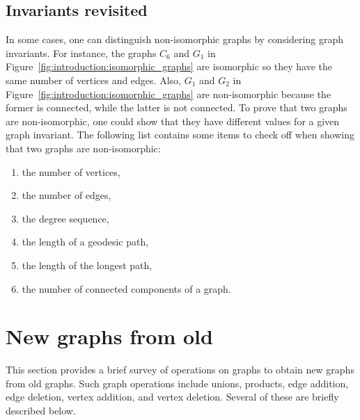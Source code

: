 
\subsection{Invariants revisited}

In some cases, one can distinguish non-isomorphic graphs by
considering graph invariants. For instance, the graphs $C_6$ and $G_1$
in Figure~\ref{fig:introduction:isomorphic_graphs} are isomorphic so
they have the same number of vertices and edges. Also, $G_1$ and $G_2$
in Figure~\ref{fig:introduction:isomorphic_graphs}  are non-isomorphic
because the former is connected, while the latter is not connected. To
prove that two graphs are non-isomorphic, one could show that they
have different values for a given graph invariant. The following list
contains some items to check off when showing that two graphs are
non-isomorphic:

\begin{enumerate}
\item the number of vertices,

\item the number of edges,

\item the degree sequence,

\item the length of a geodesic path,

\item the length of the longest path,

\item the number of connected components of a graph.
\end{enumerate}



\section{New graphs from old}
\label{sec:new_graphs_from_old}

This section provides a brief survey of operations on graphs to obtain
new graphs from old graphs. Such graph operations include unions,
products, edge addition, edge deletion, vertex addition, and vertex
deletion. Several of these are briefly described below.



